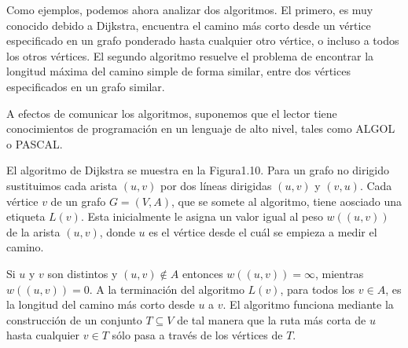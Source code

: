 \documentclass[10pt,a5paper]{book}
\begin{document}
Como ejemplos, podemos ahora analizar dos algoritmos. El primero, es muy conocido debido a Dijkstra, encuentra el camino más corto desde un vértice especificado en un grafo ponderado hasta cualquier otro vértice, o incluso a todos los otros vértices. El segundo algoritmo resuelve el problema de encontrar la longitud máxima del camino simple de forma similar, entre dos vértices especificados en un grafo similar.

A efectos de comunicar los algoritmos, suponemos que el lector tiene conocimientos de programación en un lenguaje de alto nivel, tales como ALGOL o PASCAL.

El algoritmo de Dijkstra se muestra en la Figura1.10. Para un grafo no dirigido sustituimos cada arista $(u,v)$ por dos líneas dirigidas $(u,v)$ y $(v,u)$. Cada vértice $v$ de un grafo $G = (V,A)$, que se somete al algoritmo, tiene aosciado una etiqueta $L(v)$. Esta inicialmente le asigna un valor igual al peso $w((u,v))$ de la arista $(u,v)$, donde $u$ es el vértice desde el cuál se empieza a medir el camino.

Si $u$ y $v$ son distintos y $(u,v)\notin A$ entonces $w((u,v)) = \infty$, mientras $w((u,v)) = 0$. A la terminación del algoritmo $L(v)$, para todos los $v\in A$, es la longitud del camino más corto desde $u$ a $v$. El algoritmo funciona mediante la construcción de un conjunto $T\subseteq V$ de tal manera que la ruta más corta de $u$ hasta cualquier $v\in T$ sólo pasa a través de los vértices de $T$.
\end{document}

